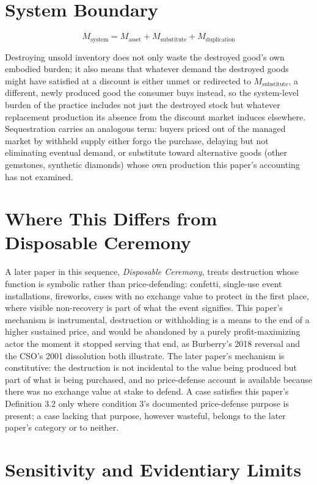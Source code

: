 \documentclass[11pt]{article}
\begin{document}
\section{System Boundary}

\[
M_{\text{system}} = M_{\text{asset}} + M_{\text{substitute}} + M_{\text{duplication}}
\]

Destroying unsold inventory does not only waste the destroyed good's own embodied burden; it also means that whatever demand the destroyed goods might have satisfied at a discount is either unmet or redirected to $M_{\text{substitute}}$, a different, newly produced good the consumer buys instead, so the system-level burden of the practice includes not just the destroyed stock but whatever replacement production its absence from the discount market induces elsewhere. Sequestration carries an analogous term: buyers priced out of the managed market by withheld supply either forgo the purchase, delaying but not eliminating eventual demand, or substitute toward alternative goods (other gemstones, synthetic diamonds) whose own production this paper's accounting has not examined.

\section{Where This Differs from Disposable Ceremony}

A later paper in this sequence, \emph{Disposable Ceremony}, treats destruction whose function is symbolic rather than price-defending: confetti, single-use event installations, fireworks, cases with no exchange value to protect in the first place, where visible non-recovery is part of what the event signifies. This paper's mechanism is instrumental, destruction or withholding is a means to the end of a higher sustained price, and would be abandoned by a purely profit-maximizing actor the moment it stopped serving that end, as Burberry's 2018 reversal and the CSO's 2001 dissolution both illustrate. The later paper's mechanism is constitutive: the destruction is not incidental to the value being produced but part of what is being purchased, and no price-defense account is available because there was no exchange value at stake to defend. A case satisfies this paper's Definition 3.2 only where condition 3's documented price-defense purpose is present; a case lacking that purpose, however wasteful, belongs to the later paper's category or to neither.

\section{Sensitivity and Evidentiary Limits}
\end{document}
